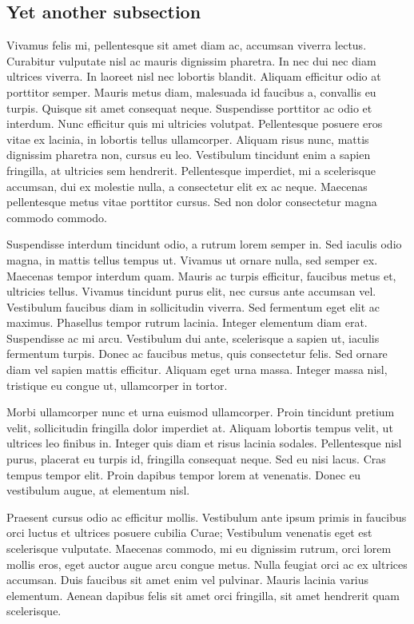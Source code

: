 \subsection{Yet another subsection}
Vivamus felis mi, pellentesque sit amet diam ac, accumsan viverra lectus. Curabitur vulputate nisl ac mauris dignissim pharetra. In nec dui nec diam ultrices viverra. In laoreet nisl nec lobortis blandit. Aliquam efficitur odio at porttitor semper. Mauris metus diam, malesuada id faucibus a, convallis eu turpis. Quisque sit amet consequat neque. Suspendisse porttitor ac odio et interdum. Nunc efficitur quis mi ultricies volutpat. Pellentesque posuere eros vitae ex lacinia, in lobortis tellus ullamcorper. Aliquam risus nunc, mattis dignissim pharetra non, cursus eu leo. Vestibulum tincidunt enim a sapien fringilla, at ultricies sem hendrerit. Pellentesque imperdiet, mi a scelerisque accumsan, dui ex molestie nulla, a consectetur elit ex ac neque. Maecenas pellentesque metus vitae porttitor cursus. Sed non dolor consectetur magna commodo commodo.

Suspendisse interdum tincidunt odio, a rutrum lorem semper in. Sed iaculis odio magna, in mattis tellus tempus ut. Vivamus ut ornare nulla, sed semper ex. Maecenas tempor interdum quam. Mauris ac turpis efficitur, faucibus metus et, ultricies tellus. Vivamus tincidunt purus elit, nec cursus ante accumsan vel. Vestibulum faucibus diam in sollicitudin viverra. Sed fermentum eget elit ac maximus. Phasellus tempor rutrum lacinia. Integer elementum diam erat. Suspendisse ac mi arcu. Vestibulum dui ante, scelerisque a sapien ut, iaculis fermentum turpis. Donec ac faucibus metus, quis consectetur felis. Sed ornare diam vel sapien mattis efficitur. Aliquam eget urna massa. Integer massa nisl, tristique eu congue ut, ullamcorper in tortor.

Morbi ullamcorper nunc et urna euismod ullamcorper. Proin tincidunt pretium velit, sollicitudin fringilla dolor imperdiet at. Aliquam lobortis tempus velit, ut ultrices leo finibus in. Integer quis diam et risus lacinia sodales. Pellentesque nisl purus, placerat eu turpis id, fringilla consequat neque. Sed eu nisi lacus. Cras tempus tempor elit. Proin dapibus tempor lorem at venenatis. Donec eu vestibulum augue, at elementum nisl.

Praesent cursus odio ac efficitur mollis. Vestibulum ante ipsum primis in faucibus orci luctus et ultrices posuere cubilia Curae; Vestibulum venenatis eget est scelerisque vulputate. Maecenas commodo, mi eu dignissim rutrum, orci lorem mollis eros, eget auctor augue arcu congue metus. Nulla feugiat orci ac ex ultrices accumsan. Duis faucibus sit amet enim vel pulvinar. Mauris lacinia varius elementum. Aenean dapibus felis sit amet orci fringilla, sit amet hendrerit quam scelerisque.

